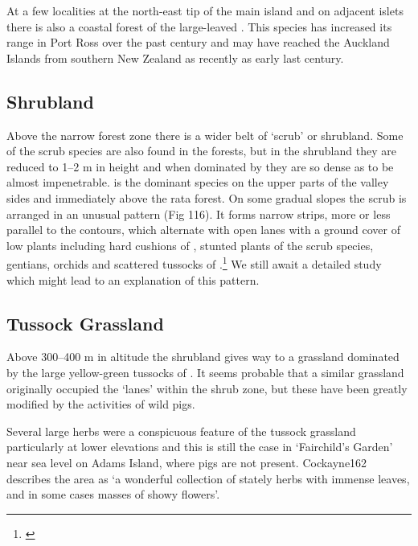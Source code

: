 At a few localities at the north-east tip of the main island and on adjacent islets there is also a coastal forest of the large-leaved .
This species has increased its range in Port Ross over the past century and may have reached the Auckland Islands from southern New Zealand as recently as early last century.

\subsection{Shrubland}

Above the narrow forest zone there is a wider belt of `scrub' or shrubland.
Some of the scrub species are also found in the forests, but in the shrubland they are reduced to 1--2 m in height and when dominated by  they are so dense as to be almost impenetrable.  is the dominant species on the upper parts of the valley sides and  immediately above the rata forest.
On some gradual slopes the scrub is arranged in an unusual pattern (Fig 116).
It forms narrow strips, more or less parallel to the contours, which alternate with open lanes with a ground cover of low plants including hard cushions of , stunted plants of the scrub species, gentians, orchids and scattered tussocks of .\footnote{\cite{godley1965notes}}
We still await a detailed study which might lead to an explanation of this pattern.

\subsection{Tussock Grassland}

Above 300--400 m in altitude the shrubland gives way to a grassland dominated by the large yellow-green tussocks of .
It seems probable that a similar grassland originally occupied the `lanes' within the shrub zone, but these have been greatly modified by the activities of wild pigs.

Several large herbs were a conspicuous feature of the tussock grassland particularly at lower elevations and this is still the case in `Fairchild's Garden' near sea level on Adams Island, where pigs are not present.
Cockayne162 describes the area as `a wonderful collection of stately herbs with immense leaves, and in some cases masses of showy flowers'.

